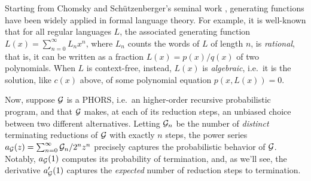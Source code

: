 %

%

Starting from Chomsky and Sch\"utzenberger's seminal work \cite{CHOMSKY1963118}, generating functions have been widely applied in formal language theory. For example, it is well-known that for all regular languages $L$, the associated generating function $L(x)=\sum_{n=0 }^{\infty}L_nx^n$, where $L_n$ counts the words of $L$ of length $n$, is \emph{rational}, that is, it can be written as a fraction $L(x)=p(x)/q(x)$ of two polynomials.
%
%
When $L$ is context-free, instead, $L(x)$ is \emph{algebraic}, i.e.~it is the solution, like $c(x)$ above, of some polynomial equation $p(x,L(x))=0$. 

%

Now, suppose $\mathcal{G}$ is a PHORS, i.e.~an higher-order recursive probabilistic program, and that $\mathcal{G}$ makes, at each of its reduction steps, an unbiased choice between two different alternatives. 
Letting $\mathcal{G}_n$ be the number of \emph{distinct} terminating reductions of $\mathcal{G}$ with exactly $n$ steps, the power series $a_{\mathcal{G}}(z)=\sum_{n=0}^{\infty}{\mathcal{G}_n}/{2^n}z^n$ precisely captures the probabilistic behavior of $\mathcal{G}$. Notably, $a_{\mathcal{G}}(1)$ computes its probability of termination, and, as we'll see, the derivative $a_{\mathcal{G}}'(1)$ captures the \emph{expected} number of reduction steps to termination.
 
